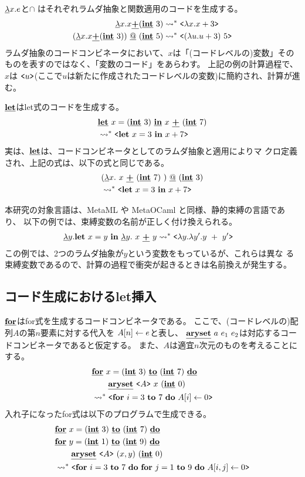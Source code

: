 $\cfun{x}{e}$と$\cap$ はそれぞれラムダ抽象と関数適用のコードを生成する。
\begin{align*}
\cfun{x}{x \cPlus (\cint~3)}   & \too \code{\fun{x}{x+3}} \\
(\cfun{x}{x \cPlus (\cint~3)}) \cat (\cint~5) & \too 
\code{(\fun{u}{u+3})~5}
\end{align*}
ラムダ抽象のコードコンビネータにおいて、$x$は「(コードレベルの)変数」その
ものを表すのではなく、「変数のコード」をあらわす。
上記の例の計算過程で、$x$は
$\code{u}$(ここで$u$は新たに作成されたコードレベルの変数)に簡約され、計算が進む。

$\cLet$はlet式のコードを生成する。
\begin{align*}
& \cLet~ x = (\cint~3)~ \cIn~ x~ \cPlus~ (\cint~7) \\
  & \too \code{\Let~ x = 3~ \In~ x + 7} 
\end{align*}
実は、$\cLet$は、コードコンビネータとしてのラムダ抽象と適用によりマ
クロ定義され、上記の式は、以下の式と同じである。
\begin{align*}
& (\cfun{x}{~x~ \cPlus~ (\cint~7)~}) \cat (\cint~3)  \\
& \too \code{\Let~ x = 3~ \In~ x + 7} 
\end{align*}

本研究の対象言語は、MetaML や MetaOCaml と同様、静的束縛の言語であり、
以下の例では、束縛変数の名前が正しく付け換えられる。
\begin{align*}
\cfun{y}{\Let~ x = y~ \In~ \cfun{y}{~x~ \cPlus~ y}{}}{} 
& \too \code{\fun{y}{\fun{y'}{y~ +~ y'}}}
\end{align*}
この例では、2つのラムダ抽象が$y$という変数をもっているが、これらは異な
る束縛変数であるので、計算の過程で衝突が起きるときは名前換えが発生する。

\subsection{コード生成におけるlet挿入}

$\cFor$はfor式を生成するコードコンビネータである。
ここで、(コードレベルの)配列$A$の第$n$要素に対する代入を
$\aryset{A}{n}{e}$と表し、
$\caryset{a}{e_1}{e_2}$は対応するコードコンビネータであると仮定する。
また、$A$は適宜$n$次元のものを考えることにする。
\begin{align*}
& \cforin{x=(\cint~3)}{(\cint~7)} \\
& \qquad \caryset{\code{A}}{x}{(\cint~0)} \\
& \too \code{\forin{i=3}{7}~\aryset{A}{i}{0}}
\end{align*}
入れ子になったfor式は以下のプログラムで生成できる。
\begin{align*}
& \cforin{x=(\cint~3)}{(\cint~7)} \\
& \cforin{y=(\cint~1)}{(\cint~9)} \\
& \qquad \caryset{\code{A}}{(x,y)}{(\cint~0)} \\
& \too \code{\forin{i=3}{7}~\forin{j=1}{9}~\aryset{A}{i,j}{0}}
\end{align*}

